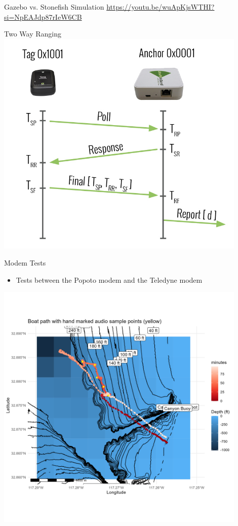\begin{frame}{Gazebo vs. Stonefish Simulation}
    \href{https://youtu.be/wuApKjsWTHI?si=NpEAJdp87rIeW6CB}{https://youtu.be/wuApKjsWTHI?si=NpEAJdp87rIeW6CB}
\end{frame}

\begin{frame}{Two Way Ranging}
    \centering
     \includegraphics[height=0.9\textheight,width=0.9\textwidth,keepaspectratio]{images/VOLT/twr.png}
\end{frame}

\begin{frame}{Modem Tests}
     \begin{itemize}
         \item Tests between the Popoto modem and the Teledyne modem
     \end{itemize}    
     \centering
     \includegraphics[height=0.9\textheight,width=0.9\textwidth,keepaspectratio]{images/VOLT/path_test_high_res.png}
 \end{frame}


